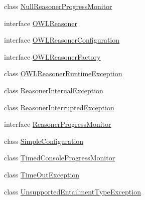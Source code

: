 \begin{DoxyCompactItemize}
class \hyperlink{classorg_1_1semanticweb_1_1owlapi_1_1reasoner_1_1_null_reasoner_progress_monitor}{Null\-Reasoner\-Progress\-Monitor}
\item 
interface \hyperlink{interfaceorg_1_1semanticweb_1_1owlapi_1_1reasoner_1_1_o_w_l_reasoner}{O\-W\-L\-Reasoner}
\item 
interface \hyperlink{interfaceorg_1_1semanticweb_1_1owlapi_1_1reasoner_1_1_o_w_l_reasoner_configuration}{O\-W\-L\-Reasoner\-Configuration}
\item 
interface \hyperlink{interfaceorg_1_1semanticweb_1_1owlapi_1_1reasoner_1_1_o_w_l_reasoner_factory}{O\-W\-L\-Reasoner\-Factory}
\item 
class \hyperlink{classorg_1_1semanticweb_1_1owlapi_1_1reasoner_1_1_o_w_l_reasoner_runtime_exception}{O\-W\-L\-Reasoner\-Runtime\-Exception}
\item 
class \hyperlink{classorg_1_1semanticweb_1_1owlapi_1_1reasoner_1_1_reasoner_internal_exception}{Reasoner\-Internal\-Exception}
\item 
class \hyperlink{classorg_1_1semanticweb_1_1owlapi_1_1reasoner_1_1_reasoner_interrupted_exception}{Reasoner\-Interrupted\-Exception}
\item 
interface \hyperlink{interfaceorg_1_1semanticweb_1_1owlapi_1_1reasoner_1_1_reasoner_progress_monitor}{Reasoner\-Progress\-Monitor}
\item 
class \hyperlink{classorg_1_1semanticweb_1_1owlapi_1_1reasoner_1_1_simple_configuration}{Simple\-Configuration}
\item 
class \hyperlink{classorg_1_1semanticweb_1_1owlapi_1_1reasoner_1_1_timed_console_progress_monitor}{Timed\-Console\-Progress\-Monitor}
\item 
class \hyperlink{classorg_1_1semanticweb_1_1owlapi_1_1reasoner_1_1_time_out_exception}{Time\-Out\-Exception}
\item 
class \hyperlink{classorg_1_1semanticweb_1_1owlapi_1_1reasoner_1_1_unsupported_entailment_type_exception}{Unsupported\-Entailment\-Type\-Exception}
\end{DoxyCompactItemize}
